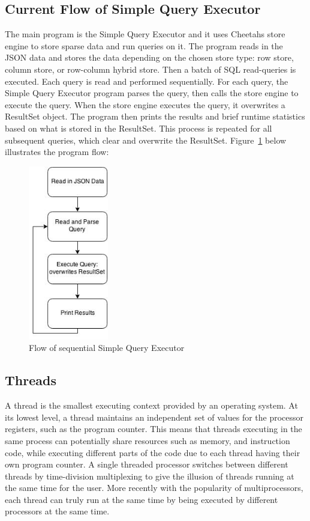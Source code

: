 \documentclass[11pt,journal,compsoc]{IEEEtran}
\begin{document}
\subsection{Current Flow of Simple Query Executor}

The main program is the Simple Query Executor and it uses Cheetah\textquotesingle s store engine to store sparse data and run queries on it. The program reads in the JSON data and stores the data depending on the chosen store type: row store, column store, or row-column hybrid store. Then a batch of SQL read-queries is executed. Each query is read and performed sequentially. For each query, the Simple Query Executor program parses the query, then calls the store engine to execute the query. When the store engine executes the query, it overwrites a ResultSet object. The program then prints the results and brief runtime statistics based on what is stored in the ResultSet. This process is repeated for all subsequent queries, which clear and overwrite the ResultSet. Figure~\ref{fig_sequential_query} below illustrates the program flow:

\begin{figure}[!t]
\centering
\includegraphics[height=3in]{images/query_sequential}
\caption{Flow of sequential Simple Query Executor}
\label{fig_sequential_query}
\end{figure}

\subsection{Threads}
A thread is the smallest executing context provided by an operating system. At its lowest level, a thread maintains an independent set of values for the processor registers, such as the program counter. This means that threads executing in the same process can potentially share resources such as memory, and instruction code, while executing different parts of the code due to each thread having their own program counter. A single threaded processor switches between different threads by time-division multiplexing to give the illusion of threads running at the same time for the user. More recently with the popularity of multiprocessors, each thread can truly run at the same time by being executed by different processors at the same time.
\end{document}

